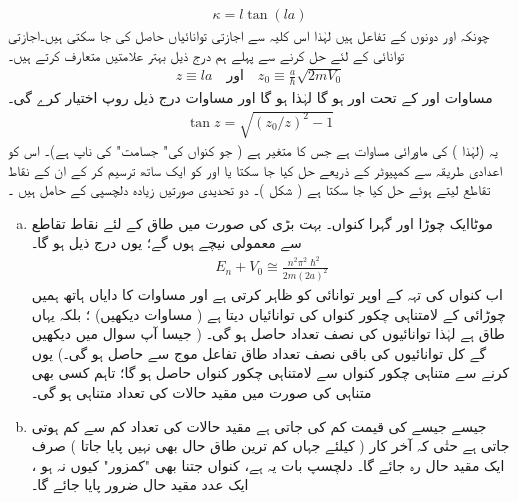 \begin{align}\label{مساوات_شروڈنگر_حل_کپا}
\kappa =l\tan(la) 
 \end{align}
 چونکہ   اور  دونوں  کے تفاعل ہیں لہٰذا   اس  کلیہ سے  اجازتی توانائیاں  حاصل کی جا سکتی  ہیں۔اجازتی توانائی  کے لئے حل کرنے سے پہلے ہم درج ذیل  بہتر علامتیں متعارف کرتے ہیں۔
\begin{align}
z\equiv l a \quad \text{اور}\quad z_0\equiv\frac{a}{\hslash}\sqrt{2mV_0}
\end{align} 
مساوات   اور  کے تحت  اور ہو گا لہٰذا   ہو گا اور مساوات    درج ذیل  روپ اختیار کرے گی۔
\begin{align}
\tan z=\sqrt{(z_{0}/z)^{2}-1} 
\end{align}
 یہ   (لہٰذا  )  کی ماورائی مساوات ہے جس کا متغیر  ہے ( جو کنواں کی" جسامت" کی  ناپ ہے)۔  اس کو اعدادی طریقہ سے کمپیوٹر کے ذریعے حل کیا جا سکتا یا  اور  کو ایک ساتھ  ترسیم کر کے  ان کے نقاط تقاطع  لیتے ہوئے  حل کیا جا سکتا ہے ( شکل )۔    دو تحدیدی صورتیں زیادہ دلچسپی کے حامل ہیں ۔ 
\begin{enumerate}[a.]
\item
 موٹا{ایک چوڑا اور  گہرا کنواں۔}\quad
 بہت بڑی    کی صورت میں   طاق  کے لئے  نقاط تقاطع      سے  معمولی   نیچے ہوں گے؛   یوں درج ذیل  ہو گا۔
\begin{align}
E_{n}+V_{0}\cong \frac{n^{2}\pi^{2}\hslash^{2}}{2m(2a)^{2}}
 \end{align}
اب کنواں کی تہہ کے  اوپر توانائی کو ظاہر کرتی ہے اور مساوات کا دایاں ہاتھ  ہمیں  چوڑائی کے لامتناہی چکور  کنواں کی توانائیاں دیتا ہے  ( مساوات  دیکھیں) ؛  بلکہ    یہاں طاق ہے لہٰذا     توانائیوں کی نصف تعداد   حاصل ہو گی۔ ( جیسا آپ سوال  میں دیکھیں گے کل توانائیوں کی باقی نصف تعداد  طاق  تفاعل موج سے حاصل ہو گی۔)    یوں کرنے سے متناہی چکور  کنواں سے لامتناہی چکور  کنواں حاصل ہو گا؛  تاہم  کسی بھی متناہی  کی صورت میں مقید حالات کی تعداد متناہی ہو گی۔ 
\item 
{}\quad 
 جیسے جیسے  کی قیمت کم کی جاتی  ہے مقید حالات کی تعداد کم سے کم ہوتی جاتی ہے  حتٰی  کہ آخر کار ( کیلئے جہاں کم ترین  طاق  حال  بھی نہیں پایا جاتا )  صرف ایک  مقید حال رہ جائے گا۔    دلچسپ بات یہ ہے،  کنواں  جتنا   بھی  "کمزور"     کیوں نہ ہو ،   ایک عدد مقید حال ضرور   پایا جائے گا۔
\end{enumerate}



